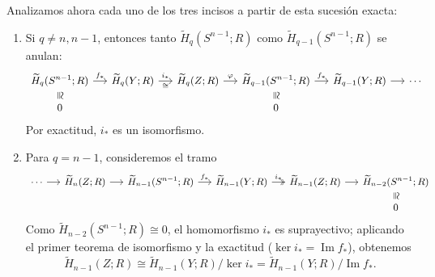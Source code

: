 \begin{dem}
Analizamos ahora cada uno de los tres incisos a partir de esta sucesión exacta:
\begin{enumerate}
    \item Si $q \neq n, n - 1$, entonces tanto $\widetilde{H}_q(S^{n-1}; R)$ como $\widetilde{H}_{q-1}(S^{n-1}; R)$ se anulan:
    \[
    {\small
    \begin{tikzcd}[column sep=1.35em, row sep=1.0em]
    \widetilde{H}_q(S^{n-1}; R)
        \arrow[r, "f_*"]
        \arrow[d, phantom, "\cong"{description, sloped, inner sep=1pt}]
    & \widetilde{H}_q(Y; R)
        \arrow[r, "i_*", "\cong"']
    & \widetilde{H}_q(Z; R)
        \arrow[r, "\varphi"]
    & \widetilde{H}_{q-1}(S^{n-1}; R)
        \arrow[r, "f_*"]
        \arrow[d, phantom, "\cong"{description, sloped, inner sep=1pt}]
    & \widetilde{H}_{q-1}(Y; R) \arrow[r]
    & \cdots \\
    0 & & & 0 & &
    \end{tikzcd}}
    \]
    Por exactitud, $i_*$ es un isomorfismo.

    \item Para $q = n - 1$, consideremos el tramo
    \[
    {\small
    \begin{tikzcd}[column sep=1.35em, row sep=1.0em]
    \cdots \arrow[r]
    & \widetilde{H}_n(Z; R) \arrow[r]
    & \widetilde{H}_{n-1}(S^{n-1}; R) \arrow[r, "f_*"]
    & \widetilde{H}_{n-1}(Y; R) \arrow[r, two heads, "i_*"]
    & \widetilde{H}_{n-1}(Z; R) \arrow[r]
    & \widetilde{H}_{n-2}(S^{n-1}; R)
        \arrow[d, phantom, "\cong"{description, sloped, inner sep=1pt}] \\
    & & & & & 0
    \end{tikzcd}}
    \]
    Como $\widetilde{H}_{n-2}(S^{n-1}; R) \cong 0$, el homomorfismo $i_*$ es suprayectivo; aplicando el primer teorema de isomorfismo y la exactitud ($\ker i_* = \operatorname{Im} f_*$), obtenemos
    \[
    \widetilde{H}_{n-1}(Z; R) \cong \widetilde{H}_{n-1}(Y; R) / \ker i_* = \widetilde{H}_{n-1}(Y; R) / \operatorname{Im} f_*.
    \]


\end{enumerate}
\end{dem}
